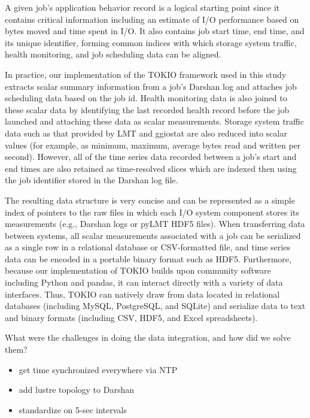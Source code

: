 A given job's application behavior record is a logical starting point since it contains critical information including an estimate of I/O performance based on bytes moved and time spent in I/O.  It also contains job start time, end time, and its unique identifier, forming common indices with which storage system traffic, health monitoring, and job scheduling data can be aligned.

In practice, our implementation of the TOKIO framework used in this study  extracts scalar summary information from a job's Darshan log and attaches job scheduling data based on the job id.
Health monitoring data is also joined to these scalar data by identifying the last recorded health record before the job launched and attaching these data as scalar measurements.
Storage system traffic data such as that provided by LMT and ggiostat are also reduced into scalar values (for example, as minimum, maximum, average bytes read and written per second).
However, all of the time series data recorded between a job's start and end times are also retained as time-resolved slices which are indexed then using the job identifier stored in the Darshan log file.

The resulting data structure is very concise and can be represented as a simple index of pointers to the raw files in which each I/O system component stores its measurements (e.g., Darshan logs or pyLMT HDF5 files).
When transferring data between systems, all scalar measurements associated with a job can be serialized as a single row in a relational database or CSV-formatted file, and time series data can be encoded in a portable binary format such as HDF5.
Furthermore, because our implementation of TOKIO builds upon community software including Python and pandas, it can interact directly with a variety of data interfaces.
Thus, TOKIO can natively draw from data located in relational databases (including MySQL, PostgreSQL, and SQLite) and serialize data to text and binary formats (including CSV, HDF5, and Excel spreadsheets).


What were the challenges in doing the data integration, and how did we solve them?

\begin{itemize}
    \item get time synchronized everywhere via NTP
    \item add lustre topology to Darshan
    \item standardize on 5-sec intervals
\end{itemize}

